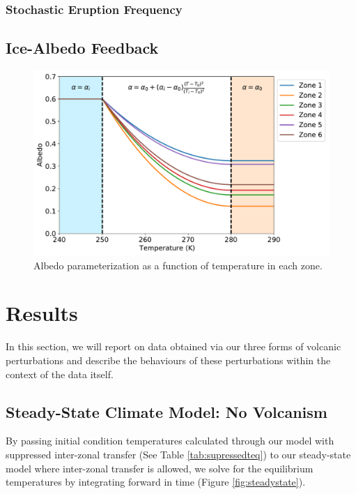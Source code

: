 \documentclass[12pt]{article}
\begin{document}
\subsubsection{Stochastic Eruption Frequency}

\subsection{Ice-Albedo Feedback}

\begin{figure}[H]
    \centering
    \includegraphics[scale=0.6]{albedo.pdf}
    \caption{
        Albedo parameterization as a function of temperature in each zone.
    }
    \label{fig:albedotemp}
\end{figure}
\FloatBarrier

\section{Results}
\label{section:results}
In this section, we will report on data obtained via our three forms of volcanic
perturbations and describe the behaviours of these perturbations within the
context of the data itself.

\subsection{Steady-State Climate Model: No Volcanism}
By passing initial condition temperatures calculated through our model with
suppressed inter-zonal transfer (See Table \ref{tab:supressedteq}) to our
steady-state model where inter-zonal transfer is allowed, we solve for the
equilibrium temperatures by integrating forward in time
(Figure \ref{fig:steadystate}).
\end{document}
